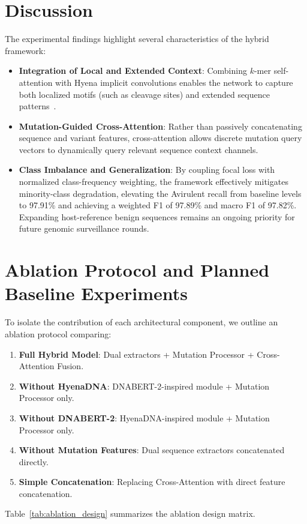 \documentclass[conference]{IEEEtran}
\begin{document}
\section{Discussion}
\label{sec:discussion}

The experimental findings highlight several characteristics of the hybrid framework:
\begin{itemize}
    \item \textbf{Integration of Local and Extended Context}: Combining $k$-mer self-attention with Hyena implicit convolutions enables the network to capture both localized motifs (such as cleavage sites) and extended sequence patterns~\cite{nguyen2023hyenadna, zhou2023dnabert2}.
    \item \textbf{Mutation-Guided Cross-Attention}: Rather than passively concatenating sequence and variant features, cross-attention allows discrete mutation query vectors to dynamically query relevant sequence context channels.
    \item \textbf{Class Imbalance and Generalization}: By coupling focal loss with normalized class-frequency weighting, the framework effectively mitigates minority-class degradation, elevating the Avirulent recall from baseline levels to 97.91\% and achieving a weighted F1 of 97.89\% and macro F1 of 97.82\%. Expanding host-reference benign sequences remains an ongoing priority for future genomic surveillance rounds.
\end{itemize}

\section{Ablation Protocol and Planned Baseline Experiments}
\label{sec:ablation_baselines}

To isolate the contribution of each architectural component, we outline an ablation protocol comparing:
\begin{enumerate}
    \item \textbf{Full Hybrid Model}: Dual extractors + Mutation Processor + Cross-Attention Fusion.
    \item \textbf{Without HyenaDNA}: DNABERT-2-inspired module + Mutation Processor only.
    \item \textbf{Without DNABERT-2}: HyenaDNA-inspired module + Mutation Processor only.
    \item \textbf{Without Mutation Features}: Dual sequence extractors concatenated directly.
    \item \textbf{Simple Concatenation}: Replacing Cross-Attention with direct feature concatenation.
\end{enumerate}
Table~\ref{tab:ablation_design} summarizes the ablation design matrix.
\end{document}
